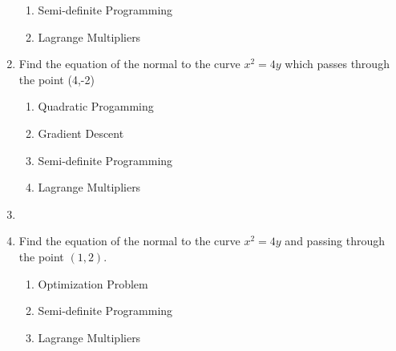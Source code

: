 \begin{enumerate}[label=\thechapter.\arabic*,ref=\thechapter.\theenumi]
\begin{enumerate}
 
\item Semi-definite Programming
	\\
\label{12/6/5/27/conv/sdp}

\item  Lagrange Multipliers
\label{12/6/5/27/conv/lagmul}

		\end{enumerate}
\item  Find the equation of the normal to the curve $x^2=4y$ which passes through the point (4,-2)
		\\
		\solution
		\begin{enumerate}
			\item Quadratic Progamming

	\item  Gradient Descent
		\\

\item Semi-definite Programming

\item  Lagrange Multipliers

		\end{enumerate}
%
\item
\label{12/6/6/22}


	\item Find the equation of the normal to the curve $x^2=4y$ and passing through the point $(1,2)$.
    \\
\solution 
		\begin{enumerate}
	\item Optimization Problem
		\\

\item Semi-definite Programming
\label{12/6/6/23}

\item  Lagrange Multipliers
	\\
\label{12/6/6/23/lagmul}

		\end{enumerate}



\end{enumerate}

